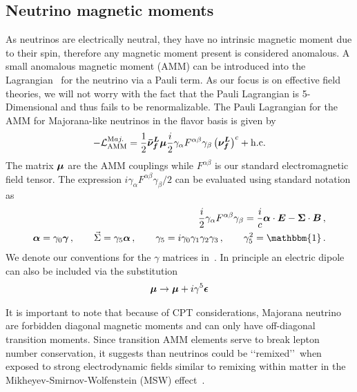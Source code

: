 \subsection{Neutrino magnetic moments}\label{sec:moment}
\noindent As neutrinos are electrically neutral, they have no intrinsic magnetic moment due to their spin, therefore any magnetic moment present is considered anomalous. A small anomalous magnetic moment (AMM) can be introduced into the Lagrangian~\citep{itzykson2012quantum,steinmetz2018magnetic} for the neutrino via a Pauli term. As our focus is on effective field theories, we will not worry with the fact that the Pauli Lagrangian is 5-Dimensional and thus fails to be renormalizable. The Pauli Lagrangian for the AMM for Majorana-like neutrinos in the flavor basis is given by
\begin{align}
	\label{moment:1} -\mathcal{L}_{\mathrm{AMM}}^{\mathrm Maj.}=\frac{1}{2}\boldsymbol{\bar{\nu}_{f}^{L}}\boldsymbol{\mu}\frac{i}{2}\gamma_{\alpha}F^{\alpha\beta}\gamma_{\beta}\left(\boldsymbol{\nu_{f}^{L}}\right)^{c}+\mathrm{h.c.}
\end{align}
The matrix $\boldsymbol{\mu}$ are the AMM couplings while $F^{\alpha\beta}$ is our standard electromagnetic field tensor. The expression $i\gamma_{\alpha}F^{\alpha\beta}\gamma_{\beta}/2$ can be evaluated using standard notation as
\begin{align}
	\label{convention:1}
    \frac{i}{2}\gamma_{\alpha}F^{\alpha\beta}\gamma_{\beta} = \frac{i}{c}\bb{\alpha}\cdot\bb{E}-\bb{\Sigma}\cdot\bb{B}\,,\\
	\label{convention:2}
    \bb{\alpha}=\gamma_{0}\bb{\gamma}\,,\qquad
    \vec{\Sigma}=\gamma_{5}\bb{\alpha}\,,\qquad
    \gamma_{5}=i\gamma_{0}\gamma_{1}\gamma_{2}\gamma_{3}\,,\qquad
    \gamma_{5}^{2}=\mathbbm{1}\,.
\end{align}
We denote our conventions for the $\gamma$ matrices in~. In principle an electric dipole can also be included via the substitution
\begin{align}
    \label{electric:1}
    \boldsymbol{\mu}\rightarrow\boldsymbol{\mu}+i\gamma^{5}\boldsymbol{\epsilon}
\end{align}

It is important to note that because of CPT considerations, Majorana neutrino are forbidden diagonal magnetic moments and can only have off-diagonal transition moments. Since transition AMM elements serve to break lepton number conservation, it suggests than neutrinos could be \lq\lq remixed\rq\rq\ when exposed to strong electrodynamic fields similar to remixing within matter in the Mikheyev-Smirnov-Wolfenstein (MSW) effect~\citep{wolfenstein1978neutrino,mikheev1985resonance,bethe1986possible,greiner2009gauge}. 

